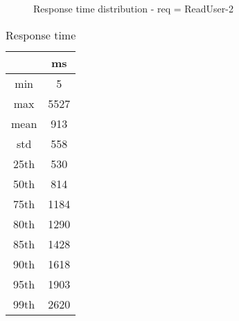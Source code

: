 \begin{minipage}{0.75\linewidth}
\begin{figure}[h]
\begin{adjustbox}{max width=1.0\linewidth, keepaspectratio}
  \end{adjustbox}
  \caption{Response time distribution - req = ReadUser-2}
\end{figure}
\end{minipage}\hfill\begin{minipage}{0.18\linewidth}
\begin{table}[h]
\begin{tabular}{|cc|}
\hline
\textbf{} & \textbf{ms}\\ \hline
 \Xhline{0.005\arrayrulewidth}
min & 5\\
 \Xhline{0.005\arrayrulewidth}
max & 5527\\
 \Xhline{0.005\arrayrulewidth}
mean & 913\\
 \Xhline{0.005\arrayrulewidth}
std & 558\\
\hline
\hline
 \Xhline{0.005\arrayrulewidth}
25th & 530\\
 \Xhline{0.005\arrayrulewidth}
50th & 814\\
 \Xhline{0.005\arrayrulewidth}
75th & 1184\\
 \Xhline{0.005\arrayrulewidth}
80th & 1290\\
 \Xhline{0.005\arrayrulewidth}
85th & 1428\\
 \Xhline{0.005\arrayrulewidth}
90th & 1618\\
 \Xhline{0.005\arrayrulewidth}
95th & 1903\\
 \Xhline{0.005\arrayrulewidth}
99th & 2620\\
\hline
\end{tabular}
\caption{Response time}
\end{table}
\end{minipage}\hfill